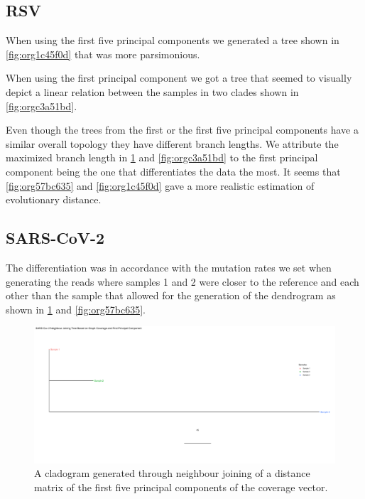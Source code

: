 \documentclass[10pt, a4paper]{article}
\begin{document}
\subsection{RSV}
\label{sec:org20ace1d}
When using the first five principal components we generated a tree shown in 
\ref{fig:org1c45f0d} that was more parsimonious.

When using the first principal component we got a tree that seemed to visually
depict a linear relation between the samples in two clades shown in
\ref{fig:orgc3a51bd}.

Even though the trees from the first or the first five principal components 
have a similar overall topology they have different branch lengths. 
We attribute the maximized branch length in \ref{fig:org1f1d629} and \ref{fig:orgc3a51bd} to the
first principal component being the one that differentiates the data the most.
It seems that \ref{fig:org57bc635} and \ref{fig:org1c45f0d} gave a more realistic estimation of
evolutionary distance.

\subsection{SARS-CoV-2}
\label{sec:orgce13f6f}
The differentiation was in accordance with the mutation rates we set when 
generating the reads where samples 1 and 2 were closer to the reference and each
other than the sample that allowed for the generation of the dendrogram as shown 
in \ref{fig:org1f1d629} and \ref{fig:org57bc635}.

\begin{landscape}
\begin{figure}
\centering
\includegraphics[width=.9\linewidth]{../Figures/SARS_CoV_2/SARS_CoV_2_first_principal_component_nj_tree.png}
\caption[SARS-CoV-2 PC1 cladogram]{\label{fig:org1f1d629}
A cladogram generated through neighbour joining  of a distance matrix of the first five  principal components of the coverage vector.}
\end{figure}
\end{landscape}
\end{document}
